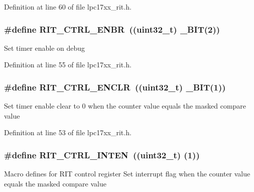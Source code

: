 \-Definition at line 60 of file lpc17xx\-\_\-rit.\-h.

\hypertarget{group___r_i_t___private___macros_ga5b766561bf28441b64bc533325e43be0}{
\subsubsection[{\-R\-I\-T\-\_\-\-C\-T\-R\-L\-\_\-\-E\-N\-B\-R}]{\setlength{\rightskip}{0pt plus 5cm}\#define {\bf \-R\-I\-T\-\_\-\-C\-T\-R\-L\-\_\-\-E\-N\-B\-R}~((uint32\-\_\-t) \-\_\-\-B\-I\-T(2))}}\label{group___r_i_t___private___macros_ga5b766561bf28441b64bc533325e43be0}
\-Set timer enable on debug 

\-Definition at line 55 of file lpc17xx\-\_\-rit.\-h.

\hypertarget{group___r_i_t___private___macros_ga16cdab6f304738d645d704ae2d161412}{
\subsubsection[{\-R\-I\-T\-\_\-\-C\-T\-R\-L\-\_\-\-E\-N\-C\-L\-R}]{\setlength{\rightskip}{0pt plus 5cm}\#define {\bf \-R\-I\-T\-\_\-\-C\-T\-R\-L\-\_\-\-E\-N\-C\-L\-R}~((uint32\-\_\-t) \-\_\-\-B\-I\-T(1))}}\label{group___r_i_t___private___macros_ga16cdab6f304738d645d704ae2d161412}
\-Set timer enable clear to 0 when the counter value equals the masked compare value 

\-Definition at line 53 of file lpc17xx\-\_\-rit.\-h.

\hypertarget{group___r_i_t___private___macros_ga90ccfd54cf911b14a20ae0e355f16d31}{
\subsubsection[{\-R\-I\-T\-\_\-\-C\-T\-R\-L\-\_\-\-I\-N\-T\-E\-N}]{\setlength{\rightskip}{0pt plus 5cm}\#define {\bf \-R\-I\-T\-\_\-\-C\-T\-R\-L\-\_\-\-I\-N\-T\-E\-N}~((uint32\-\_\-t) (1))}}\label{group___r_i_t___private___macros_ga90ccfd54cf911b14a20ae0e355f16d31}
\-Macro defines for \-R\-I\-T control register \-Set interrupt flag when the counter value equals the masked compare value 

